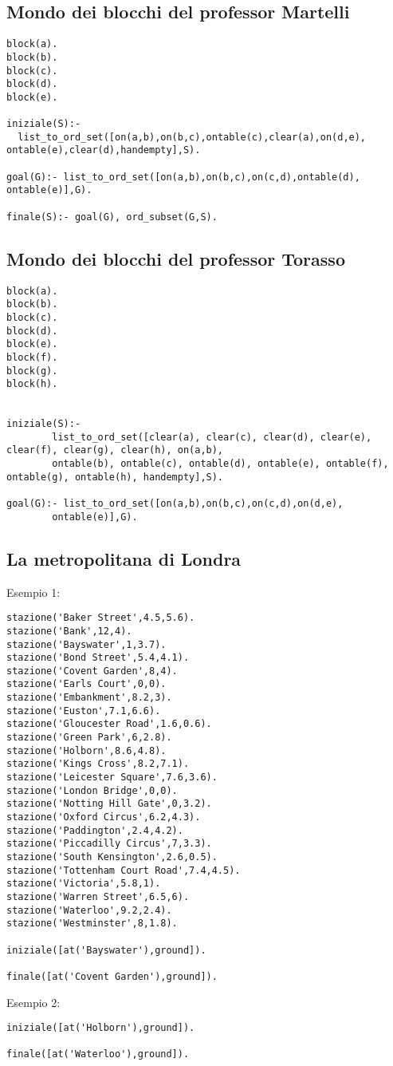 \subsection{Mondo dei blocchi del professor Martelli}

\begin{lstlisting}
block(a).
block(b).
block(c).
block(d).
block(e).

iniziale(S):-
  list_to_ord_set([on(a,b),on(b,c),ontable(c),clear(a),on(d,e), ontable(e),clear(d),handempty],S).

goal(G):- list_to_ord_set([on(a,b),on(b,c),on(c,d),ontable(d), ontable(e)],G).

finale(S):- goal(G), ord_subset(G,S).
\end{lstlisting}

\subsection{Mondo dei blocchi del professor Torasso}

\begin{lstlisting}
block(a).
block(b).
block(c).
block(d).
block(e).
block(f).
block(g).
block(h).


iniziale(S):-
        list_to_ord_set([clear(a), clear(c), clear(d), clear(e), clear(f), clear(g), clear(h), on(a,b),
        ontable(b), ontable(c), ontable(d), ontable(e), ontable(f), ontable(g), ontable(h), handempty],S).

goal(G):- list_to_ord_set([on(a,b),on(b,c),on(c,d),on(d,e),
        ontable(e)],G).
\end{lstlisting}

\subsection{La metropolitana di Londra}

Esempio 1:

\begin{lstlisting}
stazione('Baker Street',4.5,5.6).
stazione('Bank',12,4).
stazione('Bayswater',1,3.7).
stazione('Bond Street',5.4,4.1).
stazione('Covent Garden',8,4).
stazione('Earls Court',0,0).
stazione('Embankment',8.2,3).
stazione('Euston',7.1,6.6).
stazione('Gloucester Road',1.6,0.6).
stazione('Green Park',6,2.8).
stazione('Holborn',8.6,4.8).
stazione('Kings Cross',8.2,7.1).
stazione('Leicester Square',7.6,3.6).
stazione('London Bridge',0,0).
stazione('Notting Hill Gate',0,3.2).
stazione('Oxford Circus',6.2,4.3).
stazione('Paddington',2.4,4.2).
stazione('Piccadilly Circus',7,3.3).
stazione('South Kensington',2.6,0.5).
stazione('Tottenham Court Road',7.4,4.5).
stazione('Victoria',5.8,1).
stazione('Warren Street',6.5,6).
stazione('Waterloo',9.2,2.4).
stazione('Westminster',8,1.8).

iniziale([at('Bayswater'),ground]).

finale([at('Covent Garden'),ground]).
\end{lstlisting}

Esempio 2:

\begin{lstlisting}
iniziale([at('Holborn'),ground]).

finale([at('Waterloo'),ground]).
\end{lstlisting}
